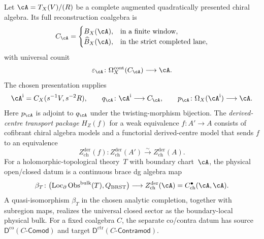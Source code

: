 \begin{definition}
\label{def:hc-typed-recovery-data}
Let $\cA=T_X(V)/(R)$ be a complete augmented quadratically presented
chiral algebra.  Its full reconstruction coalgebra is
\[
C_\cA=
\begin{cases}
B_X(\cA),&\text{in a finite window},\\
\widehat B_X(\cA),&\text{in the strict completed lane},
\end{cases}
\]
with universal counit
\[
\varepsilon_\cA\colon
\Omega_X^{\mathrm{cont}}(C_\cA)\longrightarrow\cA.
\]
The chosen presentation supplies
\[
\cA^{\mathrm i}=C_X(s^{-1}V,s^{-2}R),\qquad
q_\cA\colon\cA^{\mathrm i}\longrightarrow C_\cA,
\qquad
p_\cA\colon\Omega_X(\cA^{\mathrm i})\longrightarrow\cA.
\]
Here $p_\cA$ is adjoint to $q_\cA$ under the twisting-morphism
bijection.  The
\emph{derived-centre transport package} $H_Z(f)$ for a weak
equivalence $f\colon A'\to A$ consists of cofibrant chiral algebra
models and a functorial derived-centre model that sends $f$ to an
equivalence
\[
 Z^{\mathrm{der}}_{\mathrm{ch}}(f)\colon
 Z^{\mathrm{der}}_{\mathrm{ch}}(A')
 \xrightarrow{\sim}Z^{\mathrm{der}}_{\mathrm{ch}}(A).
\]
For a holomorphic-topological theory~$T$ with boundary chart~$\cA$,
the physical open/closed datum is a continuous brace dg algebra map
\[
\beta_T\colon
\bigl(\operatorname{Loc}_{\partial}
\operatorname{Obs}^{\mathrm{bulk}}(T),Q_{\mathrm{BRST}}\bigr)
\longrightarrow Z^{\mathrm{der}}_{\mathrm{ch}}(\cA)
=C^\bullet_{\mathrm{ch}}(\cA,\cA).
\]
A quasi-isomorphism $\beta_T$ in the chosen analytic completion,
together with subregion maps, realizes the universal closed sector as
the boundary-local physical bulk.  For a fixed coalgebra $C$, the
separate co/contra datum has source
$\mathsf D^{\mathrm{co}}(C\text{-}\mathsf{Comod})$ and target
$\mathsf D^{\mathrm{ctr}}(C\text{-}\mathsf{Contramod})$.
\end{definition}


